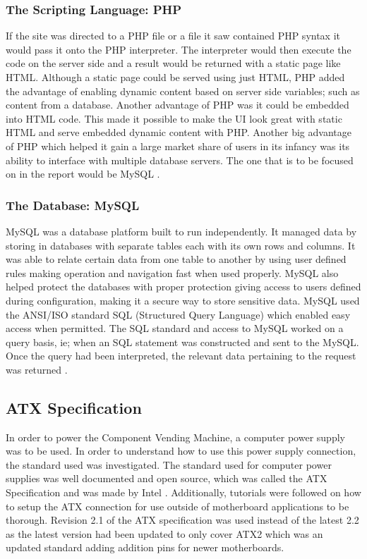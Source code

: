 \documentclass[a4paper,11pt]{article}
\numberwithin{figure}{section}
\numberwithin{table}{section}
\begin{document}
\subsubsection{The Scripting Language: PHP}
If the site was directed to a PHP file or a file it saw contained PHP syntax it would pass it onto the PHP interpreter. The interpreter would then execute the code on the server side and a result would be returned with a static page like HTML. Although a static page could be served using just HTML, PHP added the advantage of enabling dynamic content based on server side variables; such as content from a database. Another advantage of PHP was it could be embedded into HTML code. This made it possible to make the UI look great with static HTML and serve embedded dynamic content with PHP. Another big advantage of PHP which helped it gain a large market share of users in its infancy was its ability to interface with multiple database servers. The one that is to be focused on in the report would be MySQL \cite{PHP}.


\subsubsection{The Database: MySQL}
MySQL was a database platform built to run independently. It managed data by storing in databases with separate tables each with its own rows and columns. It was able to relate certain data from one table to another by using user defined rules making operation and navigation fast when used properly. MySQL also helped protect the databases with proper protection giving access to users defined during configuration, making it a secure way to store sensitive data. MySQL used the ANSI/ISO standard SQL (Structured Query Language) which enabled easy access when permitted. The SQL standard and access to MySQL worked on a query basis, ie; when an SQL statement was constructed and sent to the MySQL. Once the query had been interpreted, the relevant data pertaining to the request was returned \cite{mysql}.  

\subsection{ATX Specification}
In order to power the Component Vending Machine, a computer power supply was to be used. In order to understand how to use this power supply connection, the standard used was investigated. The standard used for computer power supplies was well documented and open source, which was called the ATX Specification and was made by Intel \cite{ATX}. Additionally, tutorials were followed on how to setup the ATX connection for use outside of motherboard applications to be thorough. Revision 2.1 of the ATX specification was used instead of the latest 2.2 as the latest version had been updated to only cover ATX2 which was an updated standard adding addition pins for newer motherboards.
\end{document}
